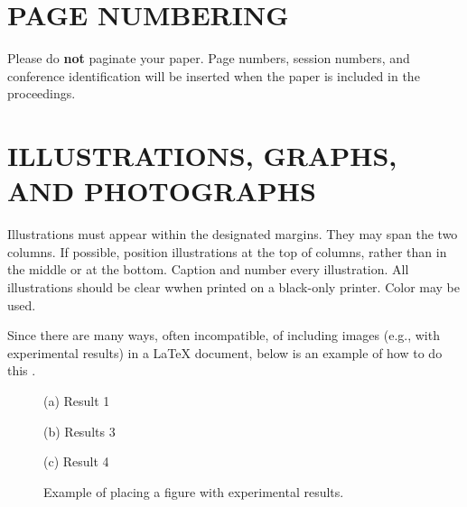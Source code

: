 \documentclass{article}
\begin{document}
\section{PAGE NUMBERING}
\label{sec:page}

Please do {\bf not} paginate your paper.  Page numbers, session numbers, and
conference identification will be inserted when the paper is included in the
proceedings.

\section{ILLUSTRATIONS, GRAPHS, AND PHOTOGRAPHS}
\label{sec:illust}

Illustrations must appear within the designated margins.  They may span the two
columns.  If possible, position illustrations at the top of columns, rather
than in the middle or at the bottom.  Caption and number every illustration.
All illustrations should be clear wwhen printed on a black-only printer. Color
may be used.

Since there are many ways, often incompatible, of including images (e.g., with
experimental results) in a LaTeX document, below is an example of how to do
this \cite{Lamp86}.

\begin{figure}[htb]

\begin{minipage}[b]{1.0\linewidth}
  \centering
  \vspace{2.0cm}
  \centerline{(a) Result 1}\medskip
\end{minipage}
%
\begin{minipage}[b]{.48\linewidth}
  \centering
  \vspace{1.5cm}
  \centerline{(b) Results 3}\medskip
\end{minipage}
\hfill
\begin{minipage}[b]{0.48\linewidth}
  \centering
  \vspace{1.5cm}
  \centerline{(c) Result 4}\medskip
\end{minipage}
%
\caption{Example of placing a figure with experimental results.}
\label{fig:res}
%
\end{figure}
\end{document}
